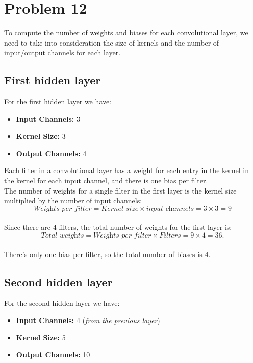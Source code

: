 \section{Problem 12}

To compute the number of weights and biases for each convolutional layer, we need to take into consideration the size of kernels and the number of input/output channels for each layer.

\subsection{First hidden layer}
For the first hidden layer we have:
\begin{itemize}
	\item \textbf{Input Channels:} 3
	\item \textbf{Kernel Size:} 3
	\item \textbf{Output Channels:} 4
\end{itemize}

Each filter in a convolutional layer has a weight for each entry in the kernel in the kernel for each input channel, and there is one bias per filter.\\ 

The number of weights for a single filter in the first layer is the kernel size multiplied by the number of input channels:
\[
\textit{Weights per filter} = \textit{Kernel size} \times \textit{input channels} = 3 \times 3 = 9
\] \\ 

Since there are $4$ filters, the total number of weights for the first layer is: 
\[
\textit{Total weights} = \textit{Weights per filter} \times \textit{Filters} = 9\times 4 = 36.
\] \\ 

There's only one bias per filter, so the total number of biases is $4$.

\subsection{Second hidden layer}
For the second hidden layer we have:
\begin{itemize}
	\item \textbf{Input Channels:} 4 (\textit{\small from the previous layer})
	\item \textbf{Kernel Size:} 5
	\item \textbf{Output Channels:} 10
\end{itemize}


